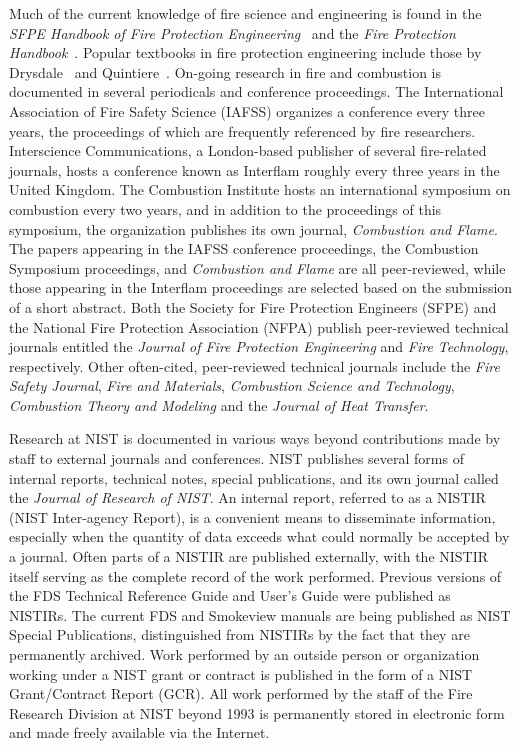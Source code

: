 \documentclass[11pt]{book}
\begin{document}
Much of the current knowledge of fire science and engineering is found in the {\em SFPE Handbook of Fire Protection Engineering}~\cite{SFPE} and the {\em Fire Protection Handbook}~\cite{NFPA}. Popular textbooks in fire protection engineering include those by Drysdale~\cite{Drysdale:1} and Quintiere~\cite{Quintiere:2}. On-going research in fire and combustion is documented in several periodicals and conference proceedings. The International Association of Fire Safety Science (IAFSS) organizes a conference every three years, the proceedings of which are frequently referenced by fire researchers. Interscience Communications, a London-based publisher of several fire-related journals, hosts a conference known as Interflam roughly every three years in the United Kingdom. The Combustion Institute hosts an international symposium on combustion every two years, and in addition to the proceedings of this symposium, the organization publishes its own journal, {\em Combustion and Flame}. The papers appearing in the IAFSS conference proceedings, the Combustion Symposium proceedings, and {\em Combustion and Flame} are all peer-reviewed, while those appearing in the Interflam proceedings are selected based on the submission of a short abstract. Both the Society for Fire Protection Engineers (SFPE) and the National Fire Protection Association (NFPA) publish peer-reviewed technical journals entitled the {\em Journal of Fire Protection Engineering} and {\em Fire Technology}, respectively. Other often-cited, peer-reviewed technical journals include the {\em Fire Safety Journal}, {\em Fire and Materials}, {\em Combustion Science and Technology}, {\em Combustion Theory and Modeling} and the {\em Journal of Heat Transfer}.

Research at NIST is documented in various ways beyond contributions made by staff to external journals and conferences. NIST publishes several forms of internal reports, technical notes, special publications, and its own journal called the {\em Journal of Research of NIST}. An internal report, referred to as a NISTIR (NIST Inter-agency Report), is a convenient means to disseminate information, especially when the quantity of data exceeds what could normally be accepted by a journal. Often parts of a NISTIR are published externally, with the NISTIR itself serving as the complete record of the work performed. Previous versions of the FDS Technical Reference Guide and User's Guide were published as NISTIRs. The current FDS and Smokeview manuals are being published as NIST Special Publications, distinguished from NISTIRs by the fact that they are permanently archived. Work performed by an outside person or organization working under a NIST grant or contract is published in the form of a NIST Grant/Contract Report (GCR). All work performed by the staff of the Fire Research Division at NIST beyond 1993 is permanently stored in electronic form and made freely available via the Internet.
\end{document}
